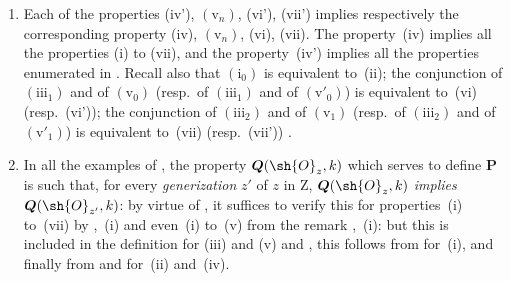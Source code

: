 \begin{remarks}[7.3.9]
\label{IV.7.3.9}
\begin{enumerate}[label=\emph{\roman*)}]
  \item Each of the properties (iv'), $(\mathrm{v}_n)$, (vi'), (vii') implies respectively the corresponding property (iv), $(\mathrm{v}_n)$, (vi), (vii).
  The property~(iv) implies all the properties (i) to (vii), and the property~(iv') implies all the properties enumerated in .
  Recall also that $(\mathrm{i}_0)$ is equivalent to~(ii); the conjunction of $(\mathrm{iii}_1)$ and of $(\mathrm{v}_0)$ (resp.~of $(\mathrm{iii}_1)$ and of $(\mathrm{v}'_0)$) is equivalent to~(vi) (resp.~(vi')); the conjunction of $(\mathrm{iii}_2)$ and of $(\mathrm{v}_1)$ (resp.~of $(\mathrm{iii}_2)$ and of $(\mathrm{v}'_1)$) is equivalent to~(vii) (resp.~(vii')) .

  \item In all the examples of , the property $\boldsymbol{Q}(\sh{O}_z,k)$ which serves to define $\boldsymbol{P}$ is such that, for every \emph{generization} $z'$ of $z$ in $\mathrm{Z}$, $\boldsymbol{Q}(\sh{O}_z,k)$ \emph{implies} $\boldsymbol{Q}(\sh{O}_{z'},k)$: by virtue of , it suffices to verify this for properties~(i) to~(vii) by ,~(i) and even~(i) to~(v) from the remark ,~(i): but this is included in the definition for (iii) and (v)  and , this follows from  for~(i), and finally from  and  for~(ii) and~(iv).
\end{enumerate}
\end{remarks}

